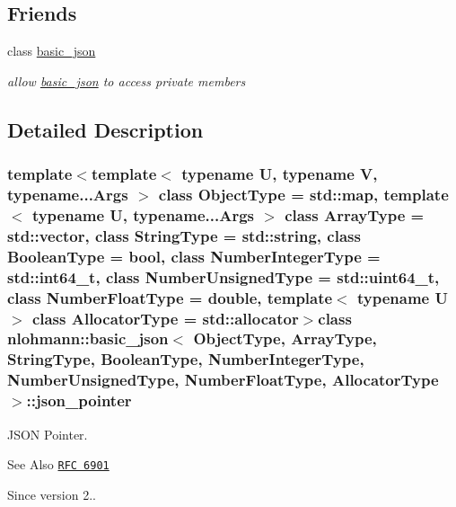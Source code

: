 \subsection*{Friends}
\begin{DoxyCompactItemize}
\item 
\hypertarget{classnlohmann_1_1basic__json_1_1json__pointer_a069a4f73a702f4c2bc0d14ca1565a7b0_a069a4f73a702f4c2bc0d14ca1565a7b0}{class \hyperlink{classnlohmann_1_1basic__json_1_1json__pointer_a069a4f73a702f4c2bc0d14ca1565a7b0_a069a4f73a702f4c2bc0d14ca1565a7b0}{basic\-\_\-json}}\label{classnlohmann_1_1basic__json_1_1json__pointer_a069a4f73a702f4c2bc0d14ca1565a7b0_a069a4f73a702f4c2bc0d14ca1565a7b0}

\begin{DoxyCompactList}\small\item\em allow \hyperlink{classnlohmann_1_1basic__json}{basic\-\_\-json} to access private members \end{DoxyCompactList}\end{DoxyCompactItemize}


\subsection{Detailed Description}
\subsubsection*{template$<$template$<$ typename U, typename V, typename...\-Args $>$ class Object\-Type = std\-::map, template$<$ typename U, typename...\-Args $>$ class Array\-Type = std\-::vector, class String\-Type = std\-::string, class Boolean\-Type = bool, class Number\-Integer\-Type = std\-::int64\-\_\-t, class Number\-Unsigned\-Type = std\-::uint64\-\_\-t, class Number\-Float\-Type = double, template$<$ typename U $>$ class Allocator\-Type = std\-::allocator$>$class nlohmann\-::basic\-\_\-json$<$ Object\-Type, Array\-Type, String\-Type, Boolean\-Type, Number\-Integer\-Type, Number\-Unsigned\-Type, Number\-Float\-Type, Allocator\-Type $>$\-::json\-\_\-pointer}

J\-S\-O\-N Pointer. 

\begin{DoxySeeAlso}{See Also}
\href{https://tools.ietf.org/html/rfc6901}{\tt R\-F\-C 6901}
\end{DoxySeeAlso}
\begin{DoxySince}{Since}
version 2.. 
\end{DoxySince}


